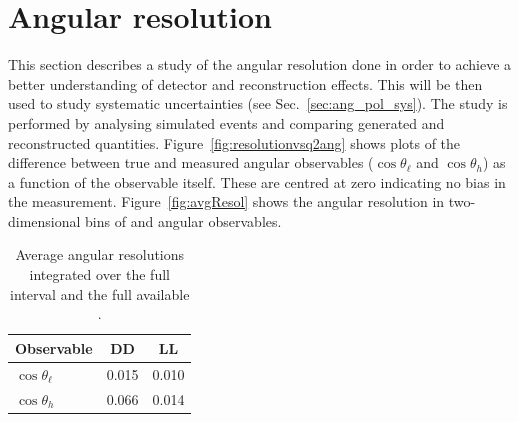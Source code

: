 \section{Angular resolution}
\label{sec:and_resolution}

This section describes a study of the angular resolution done in order to achieve a better understanding
of detector and reconstruction effects. This will be then used to study systematic uncertainties (see Sec.~\ref{sec:ang_pol_sys}).
The study is performed by analysing simulated events and comparing generated and reconstructed quantities.
Figure~\ref{fig:resolutionvsq2ang} shows plots of the difference between true and measured angular observables 
($\cos \theta_\ell$ and $\cos \theta_h$) as a function of the observable itself.
These are centred at zero indicating no bias in the measurement.
Figure~\ref{fig:avgResol} shows the angular resolution in two-dimensional bins of \qsq and angular observables.
%
\begin{table}[h]
\centering
\caption{Average angular resolutions integrated over the full interval and the full available \qsq.}
\begin{tabular}{l|cc}
Observable      & DD & LL     \\ \hline
$\cos \theta_\ell$ & 0.015 & 0.010 \\
$\cos \theta_h$ & 0.066 & 0.014 \\
\end{tabular}
\label{tab:resolutions}
\end{table}
%
